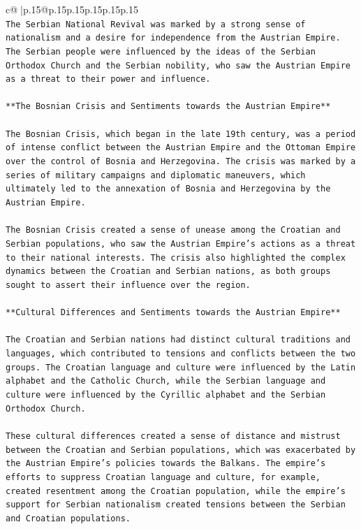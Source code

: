 \documentclass{article}
\begin{document}
{\begin{supertabular}{c@{$\;$}|p{.15\linewidth}@{}p{.15\linewidth}p{.15\linewidth}p{.15\linewidth}p{.15\linewidth}p{.15\linewidth}}
{{{\\ 
\texttt{The Serbian National Revival was marked by a strong sense of nationalism and a desire for independence from the Austrian Empire. The Serbian people were influenced by the ideas of the Serbian Orthodox Church and the Serbian nobility, who saw the Austrian Empire as a threat to their power and influence.} \\
\\ 
\texttt{**The Bosnian Crisis and Sentiments towards the Austrian Empire**} \\
\\ 
\texttt{The Bosnian Crisis, which began in the late 19th century, was a period of intense conflict between the Austrian Empire and the Ottoman Empire over the control of Bosnia and Herzegovina. The crisis was marked by a series of military campaigns and diplomatic maneuvers, which ultimately led to the annexation of Bosnia and Herzegovina by the Austrian Empire.} \\
\\ 
\texttt{The Bosnian Crisis created a sense of unease among the Croatian and Serbian populations, who saw the Austrian Empire's actions as a threat to their national interests. The crisis also highlighted the complex dynamics between the Croatian and Serbian nations, as both groups sought to assert their influence over the region.} \\
\\ 
\texttt{**Cultural Differences and Sentiments towards the Austrian Empire**} \\
\\ 
\texttt{The Croatian and Serbian nations had distinct cultural traditions and languages, which contributed to tensions and conflicts between the two groups. The Croatian language and culture were influenced by the Latin alphabet and the Catholic Church, while the Serbian language and culture were influenced by the Cyrillic alphabet and the Serbian Orthodox Church.} \\
\\ 
\texttt{These cultural differences created a sense of distance and mistrust between the Croatian and Serbian populations, which was exacerbated by the Austrian Empire's policies towards the Balkans. The empire's efforts to suppress Croatian language and culture, for example, created resentment among the Croatian population, while the empire's support for Serbian nationalism created tensions between the Serbian and Croatian populations.} \\
\\ 
}}}
\end{supertabular}}
\end{document}
